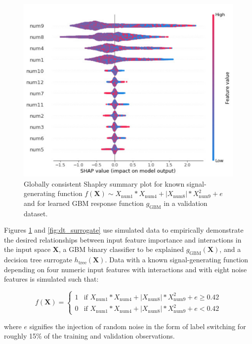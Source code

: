 \documentclass[sigconf]{acmart}
\newcommand{\twopartdef}[4]
{
	\left\{
		\begin{array}{ll}
			#1 & \mbox{if } #2 \\
			#3 & \mbox{if } #4
		\end{array}
	\right.
}
\begin{document}
\begin{figure}
	\begin{center}
		\includegraphics[scale=0.4]{img/figure_2-eps-converted-to.pdf}
		\caption{Globally consistent Shapley summary plot for known signal-generating function $f(\mathbf{X}) \sim X_{\text{num}1} * X_{\text{num}4} + |X_{\text{num}8}| * X_{\text{num}9}^2 + e$ and for learned GBM response function $g_{\text{GBM}}$ in a validation dataset.}
		\label{fig:global_shapley}
	\end{center}
\end{figure}

Figures \ref{fig:global_shapley} and \ref{fig:dt_surrogate} use simulated data to empirically demonstrate the desired relationships between input feature importance and interactions in the input space $\mathbf{X}$, a  GBM binary classifier to be explained $g_{\text{GBM}}(\mathbf{X})$, and a decision tree surrogate $h_{\text{tree}}(\mathbf{X})$. Data with a known signal-generating function depending on four numeric input features with interactions and with eight noise features is simulated such that: 

\begin{equation}
\label{eq:f}
f(\mathbf{X}) = \twopartdef {1} {X_{\text{num}1} * X_{\text{num}4} + |X_{\text{num}8}| * X_{\text{num}9}^2 + e \geq 0.42} {0} {X_{\text{num}1} * X_{\text{num}4} + |X_{\text{num}8}| * X_{\text{num}9}^2 + e < 0.42}
\end{equation}

\noindent where $e$ signifies the injection of random noise in the form of label switching for roughly 15\% of the training and validation observations. 
\end{document}
